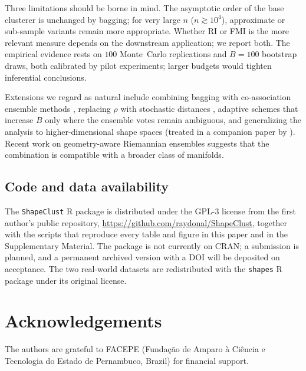 \documentclass[review,11pt,3p,authoryear]{elsarticle}
\newcommand{\ShapeClust}{\texttt{ShapeClust}}
\begin{document}
Three limitations should be borne in mind. The asymptotic order of the
base clusterer is unchanged by bagging; for very large $n$
($n\gtrsim 10^4$), approximate or sub-sample variants
\citep{ng2002clarans,schubert2019faster,schubert2021fast} remain more
appropriate. Whether RI or FMI is the more relevant measure depends on
the downstream application; we report both. The empirical evidence
rests on $100$ Monte~Carlo replications and $B=100$ bootstrap draws,
both calibrated by pilot experiments; larger budgets would tighten
inferential conclusions.

Extensions we regard as natural include combining bagging with
co-association ensemble methods
\citep{strehl2002cluster,fred2005combining,vega2011survey}, replacing
$\rho$ with stochastic distances \citep{adenice2024}, adaptive schemes
that increase $B$ only where the ensemble votes remain ambiguous, and
generalizing the analysis to higher-dimensional shape spaces (treated
in a companion paper by \citealt{nascimento2025using}). Recent work on
geometry-aware Riemannian ensembles
\citep{luo2024geometric,tabaghi2024hyperbolic} suggests that the
combination is compatible with a broader class of manifolds.

\subsection{Code and data availability}

The \ShapeClust{} R package is distributed under the GPL-3 license from the
first author's public repository, \url{https://github.com/raydonal/ShapeClust},
together with the scripts that reproduce every table and figure in this paper
and in the Supplementary Material. The package is not currently on CRAN; a
submission is planned, and a permanent archived version with a DOI will be
deposited on acceptance. The two real-world datasets are redistributed with the
\texttt{shapes} R package \citep{dryden2012shapes} under its original license.

\section*{Acknowledgements}

The authors are grateful to FACEPE (Funda\c{c}\~{a}o de Amparo \`{a}
Ci\^{e}ncia e Tecnologia do Estado de Pernambuco, Brazil) for
financial support.




\end{document}
